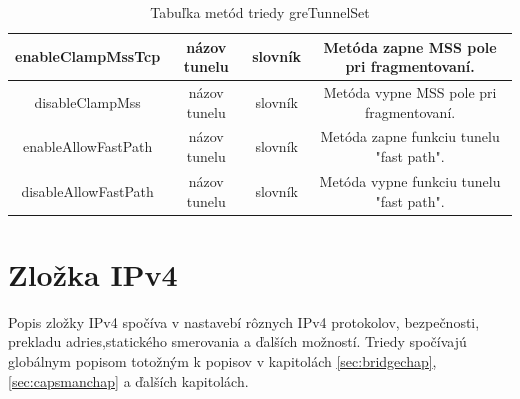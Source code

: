 \begin{table}[H]
{\begin{tabular}{|c|c|c|c|}
enableClampMssTcp & názov tunelu & slovník & Metóda zapne MSS pole pri fragmentovaní. \\ \hline
disableClampMss & názov tunelu & slovník & Metóda vypne MSS pole pri fragmentovaní. \\ \hline
enableAllowFastPath & názov tunelu & slovník & Metóda zapne funkciu tunelu "fast path". \\ \hline
disableAllowFastPath & názov tunelu & slovník & Metóda vypne funkciu tunelu "fast path". \\ \hline
\end{tabular}%
}
\caption{Tabuľka metód triedy greTunnelSet}
\label{tab:greTunel}
\end{table}
\newpage
\section{Zložka IPv4}
Popis  zložky IPv4 spočíva v nastavebí rôznych IPv4 protokolov, bezpečnosti, prekladu adries,statického smerovania a ďalších možností. Triedy spočívajú globálnym popisom totožným k popisov v kapitolách \ref{sec:bridgechap}, \ref{sec:capsmanchap} a ďalších kapitolách.  
